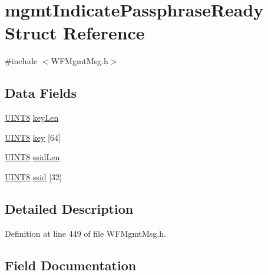 \hypertarget{structmgmt_indicate_passphrase_ready}{}\section{mgmt\+Indicate\+Passphrase\+Ready Struct Reference}
\label{structmgmt_indicate_passphrase_ready}


{\ttfamily \#include $<$W\+F\+Mgmt\+Msg.\+h$>$}

\subsection*{Data Fields}
\begin{DoxyCompactItemize}
\item 
\hyperlink{_generic_type_defs_8h_ab27e9918b538ce9d8ca692479b375b6a}{U\+I\+N\+T8} \hyperlink{structmgmt_indicate_passphrase_ready_a19c67de3f96782516f1c496a77e01074}{key\+Len}
\item 
\hyperlink{_generic_type_defs_8h_ab27e9918b538ce9d8ca692479b375b6a}{U\+I\+N\+T8} \hyperlink{structmgmt_indicate_passphrase_ready_aec7bb0b66c98ba00cd1a88efba4b5584}{key} \mbox{[}64\mbox{]}
\item 
\hyperlink{_generic_type_defs_8h_ab27e9918b538ce9d8ca692479b375b6a}{U\+I\+N\+T8} \hyperlink{structmgmt_indicate_passphrase_ready_a2172fc4e4cae6a48b945435288912995}{ssid\+Len}
\item 
\hyperlink{_generic_type_defs_8h_ab27e9918b538ce9d8ca692479b375b6a}{U\+I\+N\+T8} \hyperlink{structmgmt_indicate_passphrase_ready_ad631765096072d8ec9f442288d4280d0}{ssid} \mbox{[}32\mbox{]}
\end{DoxyCompactItemize}


\subsection{Detailed Description}


Definition at line 449 of file W\+F\+Mgmt\+Msg.\+h.



\subsection{Field Documentation}
\hypertarget{structmgmt_indicate_passphrase_ready_aec7bb0b66c98ba00cd1a88efba4b5584}{}

